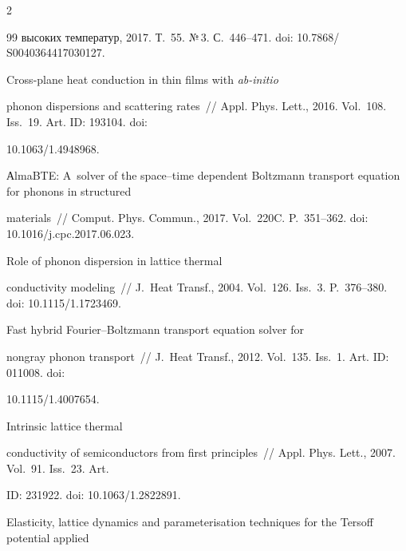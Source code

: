 \begin{multicols}{2}
{{\begin{thebibliography}{99}
высоких температур, 2017. Т.~55. №\,3. С.~446--471. doi: 10.7868/ S0040364417030127.




      Cross-plane heat conduction in thin films with \textit{ab-initio} 


phonon dispersions and scattering rates~// Appl. Phys. Lett., 2016. Vol.~108. Iss.~19. Art. ID: 193104. doi: 


10.1063/1.4948968.






АlmaBTE: A~solver of the space--time dependent Boltzmann transport equation for phonons in structured 


materials~// Comput. Phys. Commun., 2017. Vol.~220C. P.~351--362. doi: 10.1016/j.cpc.2017.06.023.


     




 Role of phonon dispersion in lattice thermal 


conductivity modeling~// J.~Heat Transf., 2004. Vol.~126. Iss.~3. P.~376--380. doi: 10.1115/1.1723469.







 Fast hybrid Fourier--Boltzmann transport equation solver for 


nongray phonon transport~// J.~Heat Transf., 2012. Vol.~135. Iss.~1. Art. ID: 011008. doi: 


10.1115/1.4007654.







 Intrinsic lattice thermal 


conductivity of semiconductors from first principles~// Appl. Phys. Lett., 2007. Vol.~91. Iss.~23. Art. 


ID: 231922. doi: 10.1063/1.2822891.




 Elasticity, lattice dynamics and parameterisation techniques for the Tersoff potential applied 



\end{thebibliography}}}
\end{multicols}
